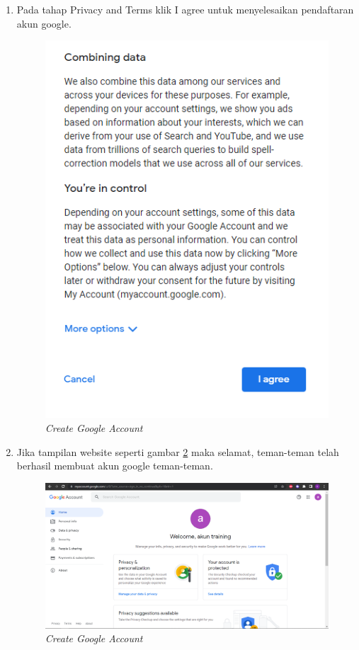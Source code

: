 \begin{enumerate}
\item Pada tahap Privacy and Terms klik I agree untuk menyelesaikan pendaftaran akun google.
\begin{figure}[H]
    \centering
    \includegraphics[scale=0.5]{figures/google7}
    \caption{\textit{Create Google Account}}
    \label{google7}
\end{figure}

\item Jika tampilan website seperti gambar \ref{google8} maka selamat, teman-teman telah berhasil membuat akun google teman-teman.
\begin{figure}[H]
    \centering
    \includegraphics[scale=0.5]{figures/google8}
    \caption{\textit{Create Google Account}}
    \label{google8}
\end{figure}

\end{enumerate}

